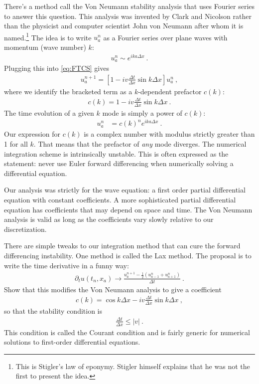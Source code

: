 There's a method call the Von Neumann stability analysis that uses Fourier series to answer this question. This analysis was invented by Clark and Nicolson rather than the physicist and computer scientist John von Neumann after whom it is named.\footnote{This is Stigler's law of eponymy. Stigler himself explains that he was not the first to present the idea.} The idea is to write $u^n_a$ as a Fourier series over plane waves with momentum (wave number) $k$:
\begin{align}
  u^n_a \sim  e^{ika\Delta x} \ .
\end{align}
Plugging this into \eqref{eq:FTCS} gives
\begin{align}
  u^{n+1}_a = 
  \left[1 - i v\frac{\Delta t}{\Delta x}\sin k\Delta x\right]u^n_a \ ,
\end{align}
where we identify the bracketed term as a $k$-dependent prefactor $c(k)$:
\begin{align}
   c(k) = 1 - i v\frac{\Delta t}{\Delta x}\sin k\Delta x \ .
\end{align}
The time evolution of a given $k$ mode is simply a power of $c(k)$:
\begin{align}
  u^{n}_a &= c(k)^n e^{ika\Delta x} \ .
\end{align}
Our expression for $c(k)$ is a complex number with modulus strictly greater than 1 for all $k$. That means that the prefactor of \emph{any} mode diverges. The numerical integration scheme is intrinsically unstable. This is often expressed as the statement: never use Euler forward differencing when numerically solving a differential equation.

Our analysis was strictly for the wave equation: a first order partial differential equation with constant coefficients. A more sophisticated partial differential equation has coefficients that may depend on space and time. The Von Neumann analysis is valid as long as the coefficients vary slowly relative to our discretization.

\begin{exercise}
There are simple tweaks to our integration method that can cure the forward differencing instability. One method is called the Lax method. The proposal is to write the time derivative in a funny way:
\begin{align}
  \partial_t u(t_n, x_a) \to
  \frac{
    u^{n+1}_a 
    - \frac{1}{2}\left(u^n_{a-1}+u^n_{a+1}\right)
    }{ \Delta t } \ .
\end{align}
Show that this modifies the Von Neumann analysis to give a coefficient
\begin{align}
  c(k) = \cos k\Delta x - i v\frac{\Delta t}{\Delta x}\sin k\Delta x \ ,
\end{align}
so that the stability condition is
\begin{align}
\frac{\Delta t}{\Delta x} \leq |v| \ .
\end{align}
This condition is called the Courant condition and is fairly generic for numerical solutions to first-order differential equations.
\end{exercise}


